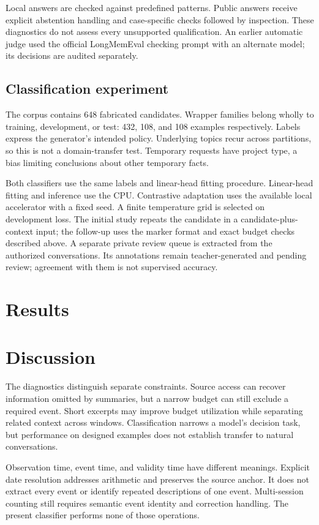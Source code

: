\documentclass[11pt]{article}
\begin{document}
Local answers are checked against predefined patterns. Public answers receive explicit abstention handling and case-specific checks followed by inspection. These diagnostics do not assess every unsupported qualification. An earlier automatic judge used the official LongMemEval checking prompt with an alternate model; its decisions are audited separately.

\subsection{Classification experiment}
The corpus contains 648 fabricated candidates. Wrapper families belong wholly to training, development, or test: 432, 108, and 108 examples respectively. Labels express the generator's intended policy. Underlying topics recur across partitions, so this is not a domain-transfer test. Temporary requests have project type, a bias limiting conclusions about other temporary facts.

Both classifiers use the same labels and linear-head fitting procedure. Linear-head fitting and inference use the CPU. Contrastive adaptation uses the available local accelerator with a fixed seed. A finite temperature grid is selected on development loss. The initial study repeats the candidate in a candidate-plus-context input; the follow-up uses the marker format and exact budget checks described above. A separate private review queue is extracted from the authorized conversations. Its annotations remain teacher-generated and pending review; agreement with them is not supervised accuracy.

\section{Results}



\section{Discussion}
The diagnostics distinguish separate constraints. Source access can recover information omitted by summaries, but a narrow budget can still exclude a required event. Short excerpts may improve budget utilization while separating related context across windows. Classification narrows a model's decision task, but performance on designed examples does not establish transfer to natural conversations.

Observation time, event time, and validity time have different meanings. Explicit date resolution addresses arithmetic and preserves the source anchor. It does not extract every event or identify repeated descriptions of one event. Multi-session counting still requires semantic event identity and correction handling. The present classifier performs none of those operations.
\end{document}
